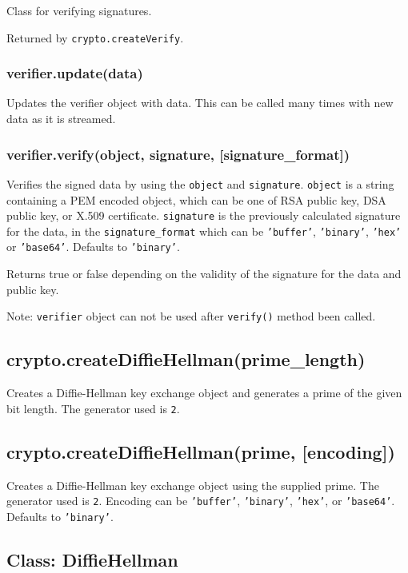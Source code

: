 Class for verifying signatures.

Returned by \texttt{crypto.createVerify}.

\subsubsection{verifier.update(data)}

Updates the verifier object with data. This can be called many times
with new data as it is streamed.

\subsubsection{verifier.verify(object, signature,
{[}signature\_format{]})}

Verifies the signed data by using the \texttt{object} and
\texttt{signature}. \texttt{object} is a string containing a PEM encoded
object, which can be one of RSA public key, DSA public key, or X.509
certificate. \texttt{signature} is the previously calculated signature
for the data, in the \texttt{signature\_format} which can be
\texttt{'buffer'}, \texttt{'binary'}, \texttt{'hex'} or
\texttt{'base64'}. Defaults to \texttt{'binary'}.

Returns true or false depending on the validity of the signature for the
data and public key.

Note: \texttt{verifier} object can not be used after \texttt{verify()}
method been called.

\subsection{crypto.createDiffieHellman(prime\_length)}

Creates a Diffie-Hellman key exchange object and generates a prime of
the given bit length. The generator used is \texttt{2}.

\subsection{crypto.createDiffieHellman(prime, {[}encoding{]})}

Creates a Diffie-Hellman key exchange object using the supplied prime.
The generator used is \texttt{2}. Encoding can be \texttt{'buffer'},
\texttt{'binary'}, \texttt{'hex'}, or \texttt{'base64'}. Defaults to
\texttt{'binary'}.

\subsection{Class: DiffieHellman}

